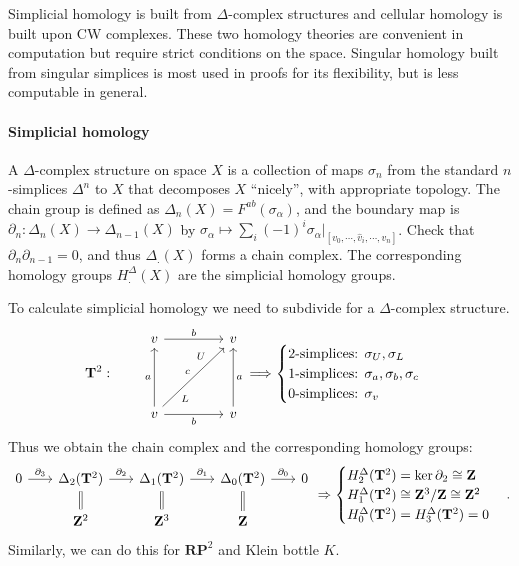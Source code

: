 \documentclass[11pt]{article}
\theoremstyle{definition}
\theoremstyle{plain}
\newcommand{\Z}{\mathbf{Z}}
\begin{document}
Simplicial homology is built from $\Delta$-complex structures and cellular homology is built upon CW complexes. These two homology theories are convenient in computation but require strict conditions on the space. Singular homology built from singular simplices is most used in proofs for its flexibility, but is less computable in general. 

\paragraph{Simplicial homology}

A $\Delta$-complex structure on space $X$ is a collection of maps $\sigma_n$ from the standard $n$-simplices $\Delta^n$ to $X$ that decomposes $X$ ``nicely'', with appropriate topology. The chain group is defined as $\Delta_n(X)=F^{ab}(\sigma_\alpha)$, and the boundary map is $\partial_n:\Delta_n(X)\to\Delta_{n-1}(X)$ by $\sigma_\alpha\mapsto\sum_i(-1)^i\sigma_\alpha|_{[v_0,\cdots,\hat{v}_i,\cdots,v_n]}$. Check that $\partial_n\partial_{n-1}=0$, and thus $\Delta_.(X)$ forms a chain complex. The corresponding homology groups $H_.^\Delta(X)$ are the simplicial homology groups.\medbreak

To calculate simplicial homology we need to subdivide for a $\Delta$-complex structure.
\[\mathbf{T}^2:\quad\quad\begin{tikzcd}[column sep=1.5cm,row sep=1.5cm]
v\arrow{r}{b}&v\\
v\arrow{u}{a}\arrow[swap]{r}{b}\arrow[ur,"U" near end,"L"' near start,"c"]&v\arrow[swap]{u}{a}
\end{tikzcd}\Longrightarrow\begin{cases}
\textrm{2-simplices: }\sigma_U,\sigma_L\\
\textrm{1-simplices: }\sigma_a,\sigma_b,\sigma_c\\
\textrm{0-simplices: }\sigma_v
\end{cases}\]
Thus we obtain the chain complex and the corresponding homology groups:
\[\begin{tikzcd}[column sep=scriptsize,row sep=scriptsize]
0\arrow{r}{\partial_3}&\Delta_2(\mathbf{T}^2)\arrow[equal]{d}\arrow{r}{\partial_2}&\Delta_1(\mathbf{T}^2)\arrow[equal]{d}\arrow{r}{\partial_1}&\Delta_0(\mathbf{T}^2)\arrow{r}{\partial_0}\arrow[equal]{d}&0\\
&\Z^2&\Z^3&\Z
\end{tikzcd}\Rightarrow\begin{cases}H_2^\Delta(\mathbf{T}^2)=\ker\partial_2\cong\Z\\
H_1^\Delta(\mathbf{T}^2)\cong\Z^3/\Z\cong\Z^2\\
H_0^\Delta(\mathbf{T}^2)=H_3^\Delta(\mathbf{T}^2)=0
\end{cases}.\]
Similarly, we can do this for $\mathbf{RP}^2$ and Klein bottle $K$.
\end{document}
